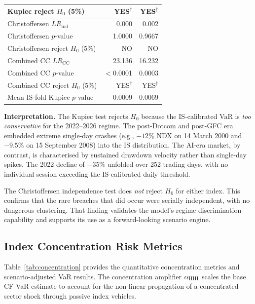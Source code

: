 \begin{table}[htbp]
\begin{tabular}{lrr}
    Kupiec reject $H_0$ (5\%)       & YES$^{\dagger}$ & YES$^{\dagger}$ \\
    \midrule
    Christoffersen $LR_{\text{ind}}$ & 0.000       & 0.002        \\
    Christoffersen $p$-value        & 1.0000       & 0.9667       \\
    Christoffersen reject $H_0$ (5\%) & NO         & NO           \\
    \midrule
    Combined CC $LR_{\text{CC}}$    & 23.136       & 16.232       \\
    Combined CC $p$-value           & $<$0.0001    & 0.0003       \\
    Combined CC reject $H_0$ (5\%)  & YES$^{\dagger}$ & YES$^{\dagger}$ \\
    \midrule
    Mean IS-fold Kupiec $p$-value   & 0.0009       & 0.0069       \\
    \bottomrule
  \end{tabular}
\end{table}

\textbf{Interpretation.} The Kupiec test rejects $H_0$ because the IS-calibrated VaR is
\emph{too conservative} for the 2022--2026 regime. The post-Dotcom and post-GFC era
embedded extreme single-day crashes (e.g., $-12\%$ NDX on 14 March 2000 and $-9.5\%$
on 15 September 2008) into the IS distribution. The AI-era market, by contrast, is
characterised by sustained drawdown velocity rather than single-day spikes. The 2022
decline of $-35\%$ unfolded over 252 trading days, with no individual session exceeding
the IS-calibrated daily threshold.

The Christoffersen independence test does \emph{not} reject $H_0$ for either index.
This confirms that the rare breaches that did occur were serially independent, with no
dangerous clustering. That finding validates the model's regime-discrimination capability
and supports its use as a forward-looking scenario engine.

\subsection{Index Concentration Risk Metrics}

Table~\ref{tab:concentration} provides the quantitative concentration metrics and
scenario-adjusted VaR results. The concentration amplifier $\alpha_{\text{HHI}}$ scales the
base CF VaR estimate to account for the non-linear propagation of a concentrated sector
shock through passive index vehicles.

